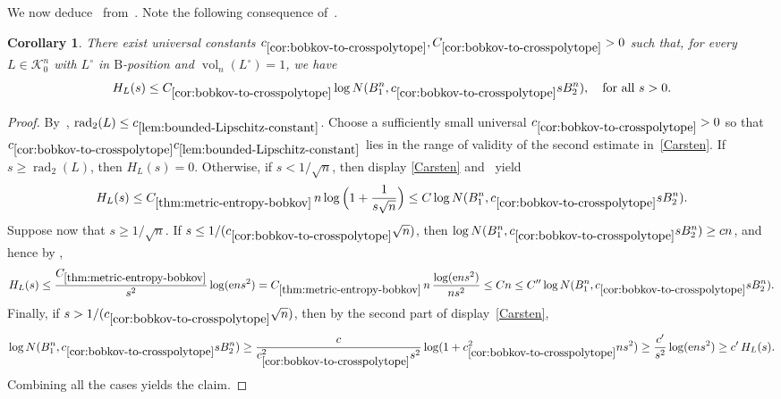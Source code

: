 \documentclass[11pt]{amsart}
\newcommand{\Vol}{\operatorname{vol}}
\newcommand{\rad}{\operatorname{rad}_2}
\newcommand{\1}{\mathbf 1}
\newcommand{\e}{\mathrm{e}}
\newcommand{\Bodies}{\mathcal{K}_0^n}
\newcommand{\Bobkov}{\mathrm{B}}
\let\vol\Vol
\theoremstyle{plain}
\newtheorem{corollary}[theorem]{Corollary}
\begin{document}
We now deduce~ from~.
Note the following consequence of~. 
\begin{corollary} 
\label{cor:bobkov-to-crosspolytope}
There exist universal constants $c_{\ref{cor:bobkov-to-crosspolytope}}, C_{\ref{cor:bobkov-to-crosspolytope}}>0$ such that, for every $L \in \Bodies$ with $L^\circ$ in $\Bobkov$-position and $\vol_n(L^\circ) = 1$, we have
\begin{equation}
\label{eq:bobkov-to-crosspolytope}
H_L(s)
\leq C_{\ref{cor:bobkov-to-crosspolytope}}\log N(B_1^n, c_{\ref{cor:bobkov-to-crosspolytope}}sB_2^n),
\quad \mbox{for all}~s>0.
\end{equation}
\end{corollary}
\begin{proof}
By~,
\(\rad(L)\leq c_{\ref{lem:bounded-Lipschitz-constant}}\). Choose a sufficiently small
universal $c_{\ref{cor:bobkov-to-crosspolytope}} > 0$ so that
$c_{\ref{cor:bobkov-to-crosspolytope}}c_{\ref{lem:bounded-Lipschitz-constant}}$ lies in the range of validity of the second
estimate in~\eqref{Carsten}. If $s\geq\rad(L)$, then $H_L(s)=0$.
Otherwise, if $s < 1/\sqrt{n}$, then display \eqref{Carsten}
and~ yield
\[
H_L(s)
\leq C_{\ref{thm:metric-entropy-bobkov}} \, n\log\Big(1+\frac{1}{s\sqrt{n}}\Big)
\leq C\log N(B_1^n,c_{\ref{cor:bobkov-to-crosspolytope}}sB_2^n).
\]
Suppose now that $s \geq 1/\sqrt{n}$. If $s \leq 1/(c_{\ref{cor:bobkov-to-crosspolytope}} \sqrt{n})$, then
$\log N(B_1^n,c_{\ref{cor:bobkov-to-crosspolytope}}sB_2^n)\geq cn$, and hence by 
,
\[
H_L(s) \leq \frac{C_{\ref{thm:metric-entropy-bobkov}}}{s^2}\log(\e ns^2)
=C_{\ref{thm:metric-entropy-bobkov}}\,n\,\frac{\log(\e ns^2)}{ns^2}
\leq Cn \leq C''\log N(B_1^n,c_{\ref{cor:bobkov-to-crosspolytope}}sB_2^n).
\]
Finally, if $s > 1/(c_{\ref{cor:bobkov-to-crosspolytope}} \sqrt{n})$, then by the second part of display~\eqref{Carsten},
\[
\log N(B_1^n,c_{\ref{cor:bobkov-to-crosspolytope}}sB_2^n)
\geq
\frac{c}{c_{\ref{cor:bobkov-to-crosspolytope}}^2s^2}\log(1+c_{\ref{cor:bobkov-to-crosspolytope}}^2ns^2)
\geq
\frac{c'}{s^2}\log(\e ns^2) \geq c' \, H_L(s).
\]
Combining all the cases yields the claim.
\end{proof}
\end{document}

